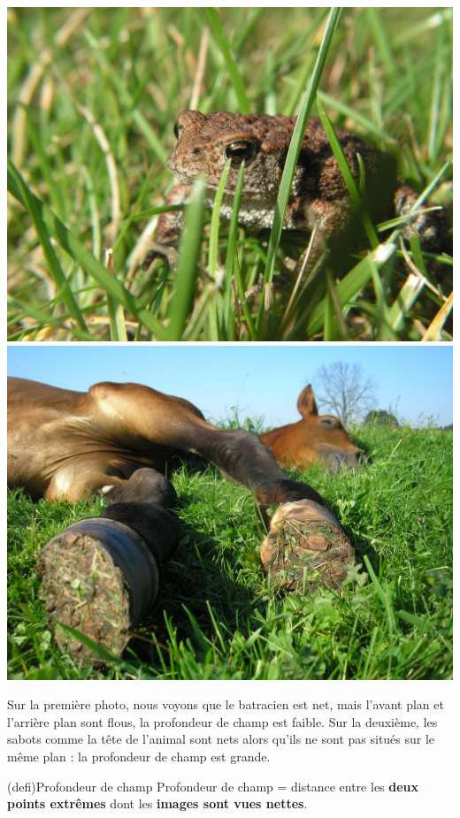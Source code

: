 \documentclass[../../main/main.tex]{subfiles}
\begin{document}
\begin{center}
	\includegraphics[scale=0.095]{photo-pdc-faible.jpg} \qquad
	\includegraphics[scale=0.095]{photo-pdc-eleve.jpg}
\end{center}

Sur la première photo, nous voyons que le batracien est net, mais l'avant plan
et l'arrière plan sont flous, la profondeur de champ est faible. Sur la
deuxième, les sabots comme la tête de l'animal sont nets alors qu'ils ne sont
pas situés sur le même plan : la profondeur de champ est grande.

\begin{tcb}[label=def:pdc](defi){Profondeur de champ}
	Profondeur de champ = distance entre les \textbf{deux points extrêmes} dont
	les \textbf{images sont vues nettes}.
\end{tcb}
\end{document}
